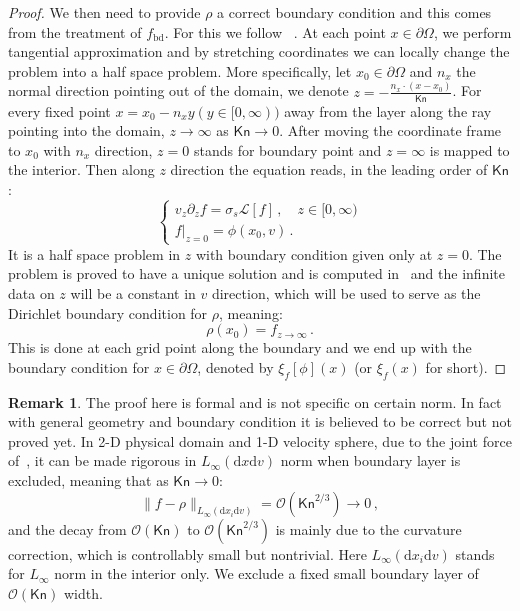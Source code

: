 \documentclass[english,reqno]{amsart}
\theoremstyle{plain}
\theoremstyle{definition} %
\newtheorem{remark}{Remark}
\newcommand{\rd}{\mathrm{d}}
\newcommand{\Kn}{\mathsf{Kn}}
\begin{document}
\begin{proof}
We then need to provide $\rho$ a correct boundary condition and this comes from the treatment of $f_\text{bd}$. For this we follow ~\cite{BLP}. At each point $x\in\partial\Omega$, we perform tangential approximation and by stretching coordinates we can locally change the problem into a half space problem. More specifically, let $x_0\in\partial\Omega$ and $n_x$ the normal direction pointing out of the domain, we denote $z = -\frac{n_x\cdot (x-x_0)}{\Kn}$. For every fixed point $x = x_0 - n_x y (y\in[0,\infty))$ away from the layer along the ray pointing into the domain, $z\to\infty$ as $\Kn\to 0$. After moving the coordinate frame to $x_0$ with $n_x$ direction, $z=0$ stands for boundary point and $z=\infty$ is mapped to the interior. Then along $z$ direction the equation reads, in the leading order of $\Kn$:
\begin{equation}\label{eqn:half_space}
\begin{cases}
v_z\partial_zf = \sigma_s\mathcal{L}[f]\,, \quad z \in [0, \infty) \\
f|_{z=0} = \phi(x_0,v)\,.
\end{cases}
\end{equation}
It is a half space problem in $z$ with boundary condition given only at $z=0$. The problem is proved to have a unique solution and is computed in~\cite{LLS} and the infinite data on $z$ will be a constant in $v$ direction, which will be used to serve as the Dirichlet boundary condition for $\rho$, meaning:
\begin{equation*}
\rho(x_0) = f_{z\to\infty}\,.
\end{equation*}
This is done at each grid point along the boundary and we end up with the boundary condition for $x\in \partial \Omega$, denoted by $\xi_f[\phi](x)$ (or $\xi_f(x)$ for short).
\end{proof}

\begin{remark}
The proof here is formal and is not specific on certain norm. In fact with general geometry and boundary condition it is believed to be correct but not proved yet. In 2-D physical domain and 1-D velocity sphere, due to the joint force of~\cite{Guo,LLS_geometry}, it can be made rigorous in $L_\infty(\rd{x}\rd{v})$ norm when boundary layer is excluded, meaning that as $\Kn\to 0$:
\begin{equation}
\|f-\rho\|_{L_\infty(\rd{x_i}\rd{v})} = \mathcal{O}(\Kn^{2/3})\to 0\,,
\end{equation}
and the decay from $\mathcal{O}(\Kn)$ to $\mathcal{O}(\Kn^{2/3})$ is mainly due to the curvature correction, which is controllably small but nontrivial. Here $L_\infty(\rd{x_i}\rd{v})$ stands for $L_\infty$ norm in the interior only. We exclude a fixed small boundary layer of $\mathcal{O}(\Kn)$ width. 
\end{remark}
\end{document}
